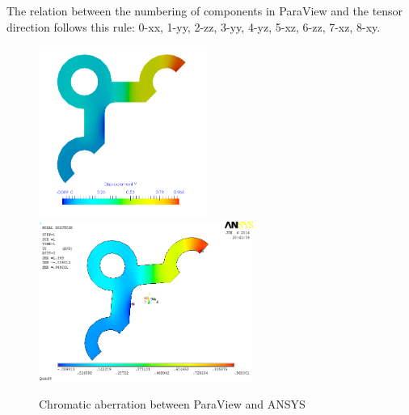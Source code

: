 The relation between the numbering of components in ParaView and the tensor direction follows this rule: 0-xx,  1-yy, 2-zz, 3-yy, 4-yz, 5-xz, 6-zz, 7-xz, 8-xy. 


\begin{figure}[htbp]
	\begin{center}
		\includegraphics[width=5.5cm,clip]{ParaViewColor.png} 	
		\includegraphics[width=7cm,clip]{ANSYSColor.png} 	
		\caption{Chromatic aberration between ParaView and ANSYS} \label{fig: Color}
	\end{center}
\end{figure}
\clearpage 

